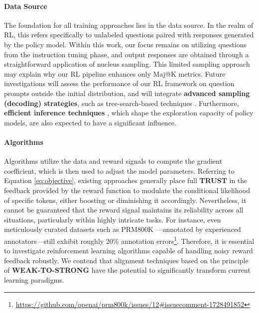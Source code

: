 \paragraph{Data Source} The foundation for all training approaches lies in the data source. In the realm of RL, this refers specifically to unlabeled questions paired with responses generated by the policy model. Within this work, our focus remains on utilizing questions from the instruction tuning phase, and output responses are obtained through a straightforward application of nucleus sampling. This limited sampling approach may explain why our RL pipeline enhances only Maj@K metrics. Future investigations will assess the performance of our RL framework on question prompts outside the initial distribution, and will integrate \textbf{advanced sampling (decoding) strategies}, such as tree-search-based techniques \citep{yao2023tree}. Furthermore, \textbf{efficient inference techniques} \citep{xia-etal-2023-speculative,leviathan2023fast,kwon2023efficient,xia2024unlocking}, which shape the exploration capacity of policy models, are also expected to have a significant influence.

\paragraph{Algorithms} Algorithms utilize the data and reward signals to compute the gradient coefficient, which is then used to adjust the model parameters. Referring to Equation \ref{eq:objective}, existing approaches generally place full \textbf{TRUST} in the feedback provided by the reward function to modulate the conditional likelihood of specific tokens, either boosting or diminishing it accordingly. Nevertheless, it cannot be guaranteed that the reward signal maintains its reliability across all situations, particularly within highly intricate tasks. For instance, even meticulously curated datasets such as PRM800K \citep{lightman2023let}—annotated by experienced annotators—still exhibit roughly 20\% annotation errors\footnote{\url{https://github.com/openai/prm800k/issues/12\#issuecomment-1728491852}}. Therefore, it is essential to investigate reinforcement learning algorithms capable of handling noisy reward feedback robustly. We contend that alignment techniques based on the principle of \textbf{WEAK-TO-STRONG} \citep{burns2023weak} have the potential to significantly transform current learning paradigms.

